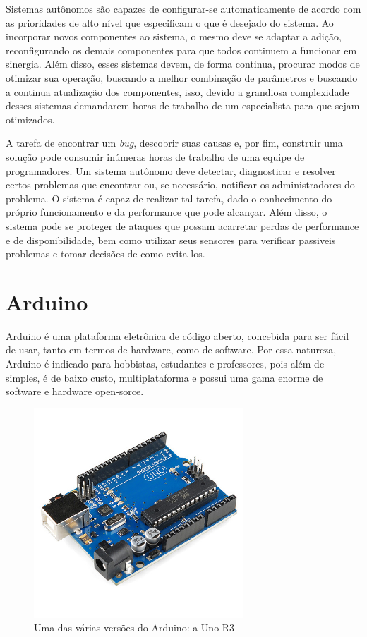 Sistemas autônomos são capazes de configurar-se automaticamente de acordo com as prioridades de alto nível que especificam o que é desejado do sistema. Ao incorporar novos componentes ao sistema, o mesmo deve se adaptar a adição, reconfigurando os demais componentes para que todos continuem a funcionar em sinergia. Além disso, esses sistemas devem, de forma continua, procurar modos de otimizar sua operação, buscando a melhor combinação de parâmetros e buscando a continua atualização dos componentes, isso, devido a grandiosa complexidade desses sistemas demandarem horas de trabalho de um especialista para que sejam otimizados.

A tarefa de encontrar um \textit{bug}, descobrir suas causas e, por fim, construir uma solução pode consumir inúmeras horas de trabalho de uma equipe de programadores. Um sistema autônomo deve detectar, diagnosticar e resolver certos problemas que encontrar ou, se necessário, notificar os administradores do problema. O sistema é capaz de realizar tal tarefa, dado o conhecimento do próprio funcionamento e da performance que pode alcançar. Além disso, o sistema pode se proteger de ataques que possam acarretar perdas de performance e de disponibilidade, bem como utilizar seus sensores para verificar passiveis problemas e tomar decisões de como evita-los.

\section{Arduino}
Arduino é uma plataforma eletrônica de código aberto,  concebida para ser fácil de usar, tanto em termos de hardware, como de software. Por essa natureza, Arduino é indicado para hobbistas, estudantes e professores, pois além de simples, é de baixo custo, multiplataforma e possui uma gama enorme de software e hardware open-sorce.\cite{Mohammed2017}

\begin{figure}[H]
    \centering
    \includegraphics[width=0.7\textwidth]{figuras/Arduino_Uno_R3.png}
    \caption{Uma das várias versões do Arduino: a Uno R3}
    \label{fig:arduino-uno}
\end{figure}

